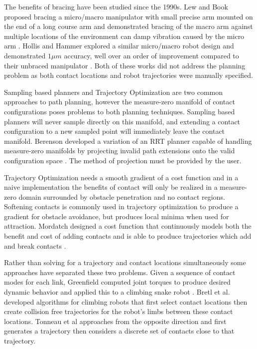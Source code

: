 \documentclass[../thesis.tex]{subfiles}
\begin{document}
The benefits of bracing have been studied since the 1990s.
Lew and Book proposed bracing a micro/macro manipulator with small precise arm mounted on the end of a long course arm and demonstrated bracing of the macro arm against multiple locations of the environment can damp vibration caused by the micro arm \cite{Book1994} \cite{Lew1993}.
Hollis and Hammer explored a similar micro/macro robot design and demonstrated $1 \mu m$ accuracy, well over an order of improvement compared to their unbraced manipulator \cite{Hollis1992}.
Both of these works did not address the planning problem as both contact locations and robot trajectories were manually specified.

Sampling based planners and Trajectory Optimization are two common approaches to path planning, however the measure-zero manifold of contact configurations poses problems to both planning techniques.
Sampling based planners will never sample directly on this manifold, and extending a contact configuration to a new sampled point will immediately leave the contact manifold.
Berenson developed a variation of an RRT planner capable of handling measure-zero manifolds by projecting invalid path extensions onto the valid configuration space \cite{Berenson2009a}.
The method of projection must be provided by the user.


Trajectory Optimization needs a smooth gradient of a cost function and in a naive implementation the benefits of contact will only be realized in a measure-zero domain surrounded by obstacle penetration and no contact regions.
Softening contacts is commonly used in trajectory optimization to produce a gradient for obstacle avoidance, but produces local minima when used for attraction.
Mordatch designed a cost function that continuously models both the benefit and cost of adding contacts and is able to produce trajectories which add and break contacts \cite{Mordatch2012}. 

Rather than solving for a trajectory and contact locations simultaneously some approaches have separated these two problems.
Given a sequence of contact modes for each link, Greenfield computed joint torques to produce desired dynamic behavior and applied this to a climbing snake robot \cite{Greenfield2005}.
Bretl et al. \cite{Bretl2006} developed algorithms for climbing robots that first select contact locations then create collision free trajectories for the robot's limbs between these contact locations.
Tonneau et al \cite{Tonneau} approaches from the opposite direction and first generates a trajectory then considers a discrete set of contacts close to that trajectory.
\end{document}
